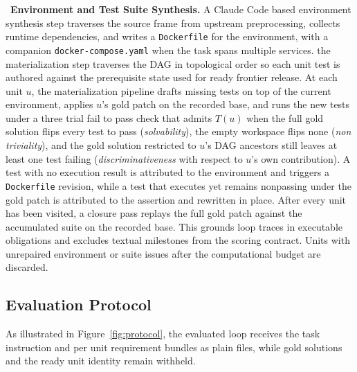 ~\textbf{Environment and Test Suite Synthesis.}
A Claude Code based environment synthesis step traverses the source frame from upstream preprocessing, collects runtime dependencies, and writes a \texttt{Dockerfile} for the environment, with a companion \texttt{docker-compose.yaml} when the task spans multiple services.
 the materialization step traverses the DAG in topological order so each unit test is authored against the prerequisite state used for ready frontier release.
At each unit $u$, the materialization pipeline drafts missing tests on top of the current environment, applies $u$'s gold patch on the recorded base, and runs the new tests under a three trial fail to pass check that admits $T(u)$ when the full gold solution flips every test to pass (\emph{solvability}), the empty workspace flips none (\emph{non triviality}), and the gold solution restricted to $u$'s DAG ancestors still leaves at least one test failing (\emph{discriminativeness} with respect to $u$'s own contribution).
A test with no execution result is attributed to the environment and triggers a \texttt{Dockerfile} revision, while a test that executes yet remains nonpassing under the gold patch is attributed to the assertion and rewritten in place.
After every unit has been visited, a closure pass replays the full gold patch against the accumulated suite on the recorded base. This grounds loop traces in executable obligations and excludes textual milestones from the scoring contract.
Units with unrepaired environment or suite issues after the computational budget are discarded.

\vspace{-3pt}
\subsection{Evaluation Protocol}\label{sec:protocol}

As illustrated in Figure~\ref{fig:protocol}, the evaluated loop receives the task instruction and per unit requirement bundles as plain files, while gold solutions and the ready unit identity remain withheld.  

